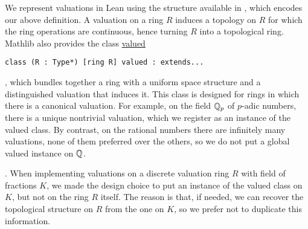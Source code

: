 \documentclass[sigplan,10pt,anonymous,review]{acmart}
\begin{document}
We represent valuations in Lean using the  structure \href{https://leanprover-community.github.io/mathlib_docs/ring_theory/valuation/basic.html#valuation}{\extlink}
 available in \mathlib, which encodes our above definition. A valuation on a ring $R$ induces a topology on $R$ for which the ring operations are continuous, hence turning $R$ into a topological ring.
Mathlib also provides the class \href{https://leanprover-community.github.io/mathlib_docs/topology/algebra/valuation.html#valued}{valued}
\begin{lstlisting}
class (R : Type*) [ring R] valued : extends...
\end{lstlisting}
, which bundles together a ring with a
uniform space structure and a distinguished valuation that induces it. This class is designed for rings in which there is a canonical valuation. For example, on the field $\mathbb{Q}_p$ of $p$-adic numbers, there is a unique nontrivial valuation, which we register as an instance of the valued class. By contrast, on the rational numbers there are infinitely many valuations, none of them preferred over the others, so we do not put a global valued instance on $\mathbb{Q}$.

. When implementing valuations on a discrete valuation ring $R$ with field of fractions $K$, we made the design choice to put an instance of the valued class on $K$, but not on the ring $R$ itself. The reason is that, if needed, we can recover the
topological structure on $R$ from the one on $K$, so we prefer not to duplicate this information. 
\end{document}
